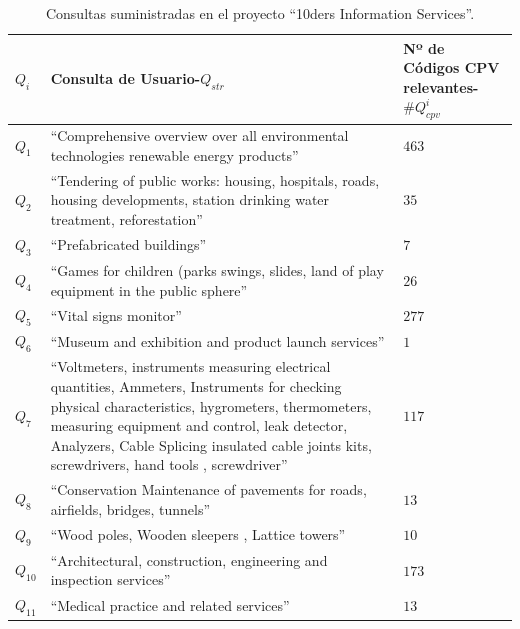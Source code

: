 \documentclass[a4paper,final,11pt,fleqn,twoside]{book}  %
\begin{document}
\begin{table}[!t]
  \centering
  \caption{Consultas suministradas en el proyecto ``10ders Information Services''.}\label{table:queries-ir}    
\begin{tabular}[c]{|l|p{10cm}|p{3cm}|} 
\hline
\textbf{$Q_{i}$} &  \textbf{Consulta de Usuario-$Q_{str}$} &  \textbf{Nº de Códigos CPV relevantes-$\#Q^{i}_{cpv}$} \\\hline
$Q_1$ & ``Comprehensive overview over all environmental technologies renewable energy products'' & $463$ \\ \hline
$Q_2$ & ``Tendering of public works: housing, hospitals, roads, housing developments, station drinking water treatment, reforestation'' & $35$ \\ \hline
$Q_3$ & ``Prefabricated buildings'' & $7$ \\ \hline
$Q_4$ & ``Games for children (parks swings, slides, land of play equipment in the public sphere'' & $26$ \\ \hline
$Q_5$ & ``Vital signs monitor'' &  $277$\\ \hline
$Q_6$ & ``Museum and exhibition and product launch services'' & $1$ \\ \hline
$Q_7$ & ``Voltmeters, instruments measuring electrical quantities, Ammeters, Instruments for checking physical characteristics, hygrometers, thermometers, measuring equipment and control, leak detector, Analyzers, 
Cable Splicing insulated cable joints kits, screwdrivers, hand tools , screwdriver'' & $117$ \\ \hline
$Q_8$ & ``Conservation Maintenance of pavements for roads, airfields, bridges, tunnels'' & $13$ \\ \hline
$Q_9$ & ``Wood poles, Wooden sleepers , Lattice towers'' & $10$ \\ \hline
$Q_{10}$ & ``Architectural, construction, engineering and inspection services'' &  $173$\\ \hline
$Q_{11}$ & ``Medical practice and related services'' &  $13$\\ \hline
\hline
 \end{tabular}

 \end{table} 
\end{document}
